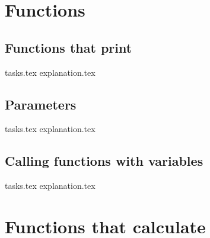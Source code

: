     \chapter{Functions}
    \newpage

    \section{Functions that print}
    {tasks.tex}        \newpage
    {explanation.tex}     \newpage

    \section{Parameters}
    {tasks.tex}       \newpage
    {explanation.tex}    \newpage

    \section{Calling functions with variables}
    {tasks.tex}         \newpage
    {explanation.tex}      \newpage

    \newpage
    \chapter{Functions that calculate}
    \newpage


